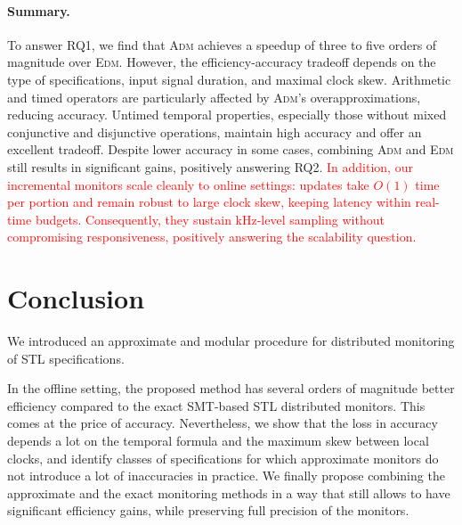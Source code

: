 \documentclass[iicol,lineno]{sn-jnl}
\newcommand{\?}{\text{?}}
\begin{document}
		\paragraph*{Summary.}
		To answer RQ1, we find that \textsc{Adm} achieves a speedup of three to five orders of magnitude over \textsc{Edm}. However, the efficiency-accuracy tradeoff depends on the type of specifications, input signal duration, and maximal clock skew. Arithmetic and timed operators are particularly affected by \textsc{Adm}'s overapproximations, reducing accuracy. Untimed temporal properties, especially those without mixed conjunctive and disjunctive operations, maintain high accuracy and offer an excellent tradeoff. Despite lower accuracy in some cases, combining \textsc{Adm} and \textsc{Edm} still results in significant gains, positively answering RQ2.
		\textcolor{red}{In addition, our incremental monitors scale cleanly to online settings: updates take $O(1)$ time per portion and remain robust to large clock skew, keeping latency within real-time budgets. Consequently, they sustain kHz-level sampling without compromising responsiveness, positively answering the scalability question.}
		
		
	\section{Conclusion} \label{sec:conclusion}
	
	We introduced an approximate and modular procedure for distributed monitoring of STL specifications.
	
	In the offline setting, the proposed method has several orders of magnitude better efficiency compared to the exact SMT-based STL distributed monitors. This comes at the price of accuracy. Nevertheless, we show that the loss in accuracy depends a lot on the temporal formula and the maximum skew between local clocks, and identify classes of specifications for which approximate monitors do not introduce a lot of inaccuracies in practice. We finally propose combining the approximate and the exact monitoring methods in a way that still allows to have significant efficiency gains, while preserving full precision of the monitors.
	
\end{document}

